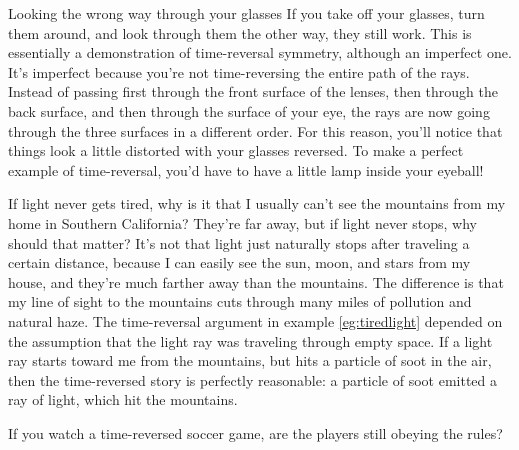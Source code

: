 \pagebreak[4]

\begin{eg}{Looking the wrong way through your glasses}
If you take off your glasses, turn them around, and look through them the other
way, they still work. This is essentially a demonstration of time-reversal
symmetry, although an imperfect one. It's imperfect because you're not
time-reversing the entire path of the rays. Instead of passing first through
the front surface of the lenses, then through the back surface, and then
through the surface of your eye, the rays are now going through the three
surfaces in a different order. For this reason, you'll notice that things look
a little distorted with your glasses reversed. To make a perfect example of
time-reversal, you'd have to have a little lamp inside your eyeball!
\end{eg}

If light never gets tired, why is it that I usually can't see the mountains from
my home in Southern California? They're far away, but if light never stops, why
should that matter? It's not that light just naturally stops after traveling
a certain distance, because I can easily see the sun, moon, and stars from my house,
and they're much farther away than the mountains. The difference is that my line
of sight to the mountains cuts through many miles of pollution and natural haze.
The time-reversal argument in example \ref{eg:tiredlight} depended on the assumption that the
light ray was traveling through empty space. If a light ray starts toward me from the
mountains, but hits a particle of
soot in the air, then the time-reversed story is perfectly reasonable: a particle
of soot emitted a ray of light, which hit the mountains.

\dqheader
\begin{dq}
If you watch a time-reversed soccer game, are the players still obeying the rules?
\end{dq}

\pagebreak[4]

